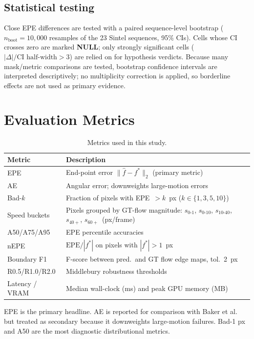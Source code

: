 \documentclass[11pt,a4paper]{article}
\let\origsection\section
\renewcommand{\section}{\FloatBarrier\origsection}
\begin{document}
\subsection{Statistical testing}
Close EPE differences are tested with a paired sequence-level bootstrap
($n_\text{boot}=10{,}000$ resamples of the 23 Sintel sequences, 95\%
CIs).  Cells whose CI crosses zero are marked \textbf{NULL}; only
strongly significant cells ($|\Delta|/ \text{CI half-width} > 3$)
are relied on for hypothesis verdicts.  Because many mask/metric
comparisons are tested, bootstrap confidence intervals are interpreted
descriptively; no multiplicity correction is applied, so borderline effects
are not used as primary evidence.

\section{Evaluation Metrics}

\begin{table}[htbp]
\centering
\caption{Metrics used in this study.}
\label{tab:metrics}
\small
\setlength{\tabcolsep}{4pt}
\begin{tabular}{lp{6.5cm}}
\toprule
Metric & Description \\
\midrule
EPE & End-point error $\|\hat{f}-f^*\|_2$ (primary metric) \\
AE & Angular error; downweights large-motion errors \cite{baker2011} \\
Bad-$k$ & Fraction of pixels with EPE~$> k$~px ($k\in\{1,3,5,10\}$) \\
Speed buckets & Pixels grouped by GT-flow magnitude: $s_{0\text{-}1}$, $s_{0\text{-}10}$, $s_{10\text{-}40}$, $s_{40+}$, $s_{60+}$~(px/frame) \\
A50/A75/A95 & EPE percentile accuracies \\
nEPE & $\text{EPE}/|f^*|$ on pixels with $|f^*|>1$~px \\
Boundary F1 & F-score between pred.\ and GT flow edge maps, tol.\ 2~px \\
R0.5/R1.0/R2.0 & Middlebury robustness thresholds \\
Latency / VRAM & Median wall-clock (ms) and peak GPU memory (MB) \\
\bottomrule
\end{tabular}
\end{table}

EPE is the primary headline.  AE is reported for comparison with Baker
et al.\ \cite{baker2011} but treated as secondary because it
downweights large-motion failures.  Bad-1 px and A50 are the most
diagnostic distributional metrics.
\end{document}
